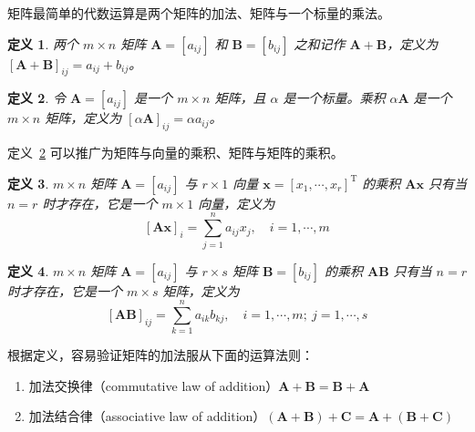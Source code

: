 \documentclass[punct=kaiming, fontset=fandol]{ctexbook}
\numberwithin{equation}{section}
\theoremstyle{mystyle}
\newtheorem{defn}{定义}[section]
\def\TT{\symsfup{T}}
\def\bf#1{\symbfit{#1}}
\def\TT{\mathrm{T}}
\def\bf#1{\bm{#1}}
\begin{document}
  矩阵最简单的代数运算是两个矩阵的加法、矩阵与一个标量的乘法。
  \begin{defn}
    两个 $m \times n$ 矩阵 $\bf A = [a_{ij}]$ 和 $\bf B = [b_{ij}]$ 之和记作 $\bf A + \bf B$，定义为 $[\bf A + \bf B]_{ij} = a_{ij} + b_{ij}$。
  \end{defn}
  \begin{defn}\label{defn:1-1-3}
    令 $\bf A = [a_{ij}]$ 是一个 $m \times n$ 矩阵，且 $\alpha$ 是一个标量。乘积 $\alpha \bf A$ 是一个 $m \times n$ 矩阵，定义为 $[\alpha \bf A]_{ij} = \alpha a_{ij}$。
  \end{defn}
  定义~\ref{defn:1-1-3} 可以推广为矩阵与向量的乘积、矩阵与矩阵的乘积。
  \begin{defn}
    $m \times n$ 矩阵 $\bf A = [a_{ij}]$ 与 $r \times 1$ 向量 $\bf x = [x_1,\cdots,x_r]^{\TT}$ 的乘积 $\bf A \bf x$ 只有当 $n = r$ 时才存在，它是一个 $m \times 1$ 向量，定义为
    \[
      [\bf A \bf x]_i = \sum_{j=1}^n a_{ij} x_j, \quad i=1,\cdots,m
    \]
  \end{defn}
  \begin{defn}
    $m \times n$ 矩阵 $\bf A = [a_{ij}]$ 与 $r \times s$ 矩阵 $\bf B = [b_{ij}]$ 的乘积 $\bf A \bf B$ 只有当 $n = r$ 时才存在，它是一个 $m \times s$ 矩阵，定义为
    \[
      [\bf A \bf B]_{ij} = \sum_{k=1}^n a_{ik} b_{kj}, \quad i=1,\cdots,m;\ j=1,\cdots,s
    \]
  \end{defn}
  根据定义，容易验证矩阵的加法服从下面的运算法则：
  \begin{enumerate}
    \item 加法交换律（commutative law of addition）$\bf A + \bf B = \bf B + \bf A$
    \item 加法结合律（associative law of addition）$(\bf A + \bf B) + \bf C = \bf A + (\bf B + \bf C)$
  \end{enumerate}
\end{document}
